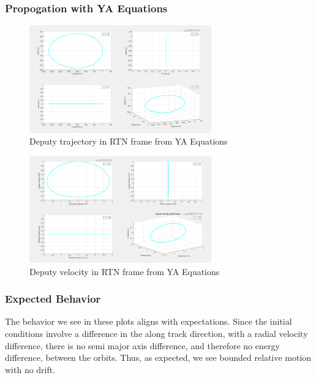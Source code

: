 \subsubsection{Propogation with YA Equations}

\begin{figure}[H]
    \centering
    \includegraphics[width=0.7\textwidth]{PS3/Figures/YA_position.png}
    \caption{Deputy trajectory in RTN frame from YA Equations}
    \label{fig:ya_position}
\end{figure}

\begin{figure}[H]
    \centering
    \includegraphics[width=0.7\textwidth]{PS3/Figures/YA_velocity.png}
    \caption{Deputy velocity in RTN frame from YA Equations}
    \label{fig:ya_velocity}
\end{figure}

\subsubsection{Expected Behavior}

The behavior we see in these plots aligns with expectations. Since the initial conditions involve a difference in the along track direction, with a radial velocity difference, there is no semi major axis difference, and therefore no energy difference, between the orbits. Thus, as expected, we see bounded relative motion with no drift.

